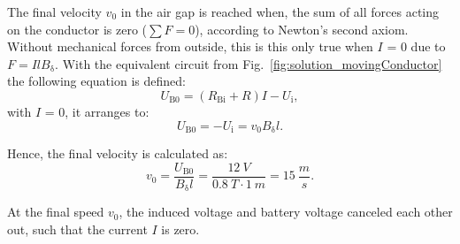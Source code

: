 
\begin{solutionblock}

    The final velocity $v_{\mathrm{0}}$ in the air gap is reached when, the sum of all forces acting on the conductor is zero ($\sum F = 0$), according to Newton's second axiom.
    Without mechanical forces from outside, this is this only true when $I$ = 0 due to $F = I l B_{\updelta}$. With the equivalent circuit from Fig.~\ref{fig:solution_movingConductor} the following equation is defined:
    \begin{equation}
        U_{\mathrm{B0}} = (R_{\mathrm{Bi}} + R) I - U_{\mathrm{i}},
    \end{equation}
    with $I$ = 0, it arranges to:
    \begin{equation}
        U_{\mathrm{B0}} = - U_{\mathrm{i}}
        = v_{\mathrm{0}} B_{\updelta} l.
    \end{equation}

    Hence, the final velocity is calculated as:
    \begin{equation}
        v_{\mathrm{0}} = \frac{U_{\mathrm{B0}}}{B_{\updelta} l}
        = \frac{12 \ \si{V}}{0.8 \ \si{T} \cdot 1 \ \si{m}}
        = 15 \ \frac{\si{m}}{\si{s}}.
    \end{equation}

    At the final speed $v_{\mathrm{0}}$, the induced voltage and battery voltage canceled each other out, such that the current $I$ is zero.

\end{solutionblock}



